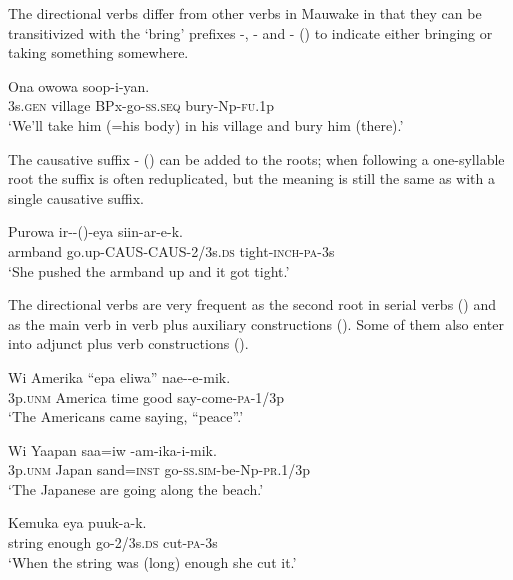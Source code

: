 The directional verbs differ from other verbs in Mauwake in that they can be transitivized with the `bring' prefixes -, - and - () to indicate either bringing or taking something somewhere.

\ea%
\label{ex:3:x286}
\gll Ona owowa  soop-i-yan. \\
3s.\textsc{gen} village BPx-go-\textsc{ss}.\textsc{seq} bury-Np-\textsc{fu}.1p \\
\glt`We'll take him (=his body) in his village and bury him (there).'
\z

The causative suffix \nobreakdash-\textstyleEmphasizedWords{} ()\textstyleEmphasizedWords{} can be added to the roots; when following a one-syllable root the suffix is often reduplicated, but the meaning is still the same as with a single causative suffix.

\ea%
\label{ex:3:x435}
\gll Purowa ir--()-eya siin-ar-e-k. \\
armband go.up-CAUS-CAUS-2/3s.\textsc{ds} tight-\textsc{inch}-\textsc{pa}-3s\\
\glt`She pushed the armband up and it got tight.'
\z

The directional verbs are very frequent as the second root in serial verbs  () and as the main verb in verb plus auxiliary constructions  (). Some of them also enter into adjunct plus verb constructions  (). 

\ea%
\label{ex:3:x287}
\gll Wi Amerika ``epa eliwa'' nae--e-mik. \\
3p.\textsc{unm} America time good say-come-\textsc{pa}-1/3p \\
\glt`The Americans came saying, ``peace''.'
\z

\ea%
\label{ex:3:x288}
\gll Wi Yaapan saa=iw -am-ika-i-mik. \\
3p.\textsc{unm} Japan sand=\textsc{inst} go-\textsc{ss}.\textsc{sim}-be-Np-\textsc{pr}.1/3p \\
\glt`The Japanese are going along the beach.'
\z

\ea%
\label{ex:3:x289}
\gll Kemuka  eya puuk-a-k. \\
string enough go-2/3s.\textsc{ds} cut-\textsc{pa}-3s \\
\glt`When the string was (long) enough she cut it.'
\z

